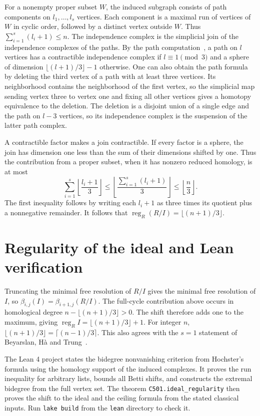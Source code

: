 \documentclass[11pt]{article}
\begin{document}
For a nonempty proper subset $W$, the induced subgraph consists of path
components on $l_1,\ldots,l_s$ vertices. Each component is a maximal run
of vertices of $W$ in cyclic order, followed by a distinct vertex outside
$W$. Thus $\sum_{i=1}^s(l_i+1)\le n$. The independence complex is the
simplicial join of the independence complexes of the paths. By the path
computation~\cite[Proposition~4.5]{kozlov}, a path on $l$ vertices has a
contractible independence complex if $l\equiv1\pmod3$ and a sphere of
dimension $\lfloor(l+1)/3\rfloor-1$ otherwise. One can also obtain the path
formula by deleting the third vertex of a path with at least three
vertices. Its neighborhood contains the neighborhood of the first vertex,
so the simplicial map sending vertex three to vertex one and fixing all
other vertices gives a homotopy equivalence to the deletion. The deletion
is a disjoint union of a single edge and the path on $l-3$ vertices, so
its independence complex is the suspension of the latter path complex.

A contractible factor makes a join contractible. If every factor is a
sphere, the join has dimension one less than the sum of their
dimensions shifted by one. Thus the contribution from a proper subset,
when it has nonzero reduced homology, is at most
\[
  \sum_{i=1}^s\left\lfloor\frac{l_i+1}{3}\right\rfloor
  \le \left\lfloor\frac{\sum_{i=1}^s(l_i+1)}{3}\right\rfloor
  \le \left\lfloor\frac{n}{3}\right\rfloor.
\]
The first inequality follows by writing each $l_i+1$ as three times its
quotient plus a nonnegative remainder. It follows that
$\operatorname{reg}_R(R/I)=\lfloor(n+1)/3\rfloor$.

\section*{Regularity of the ideal and Lean verification}

Truncating the minimal free resolution of $R/I$ gives the minimal free
resolution of $I$, so $\beta_{i,j}(I)=\beta_{i+1,j}(R/I)$. The full-cycle
contribution above occurs in homological degree
$n-\lfloor(n+1)/3\rfloor>0$. The shift therefore adds one to the maximum,
giving $\operatorname{reg}_R I=\lfloor(n+1)/3\rfloor+1$. For integer $n$,
$\lfloor(n+1)/3\rfloor=\lceil(n-1)/3\rceil$. This also agrees with the
$s=1$ statement of Beyarslan, H\`a and Trung~\cite[Theorem~5.2]{bht}.

The Lean 4 project states the bidegree nonvanishing criterion from
Hochster's formula using the homology support of the induced complexes.
It proves the run inequality for arbitrary lists, bounds all Betti
shifts, and constructs the extremal bidegree from the full vertex set.
The theorem \texttt{C501.ideal\_regularity} then proves the shift to the
ideal and the ceiling formula from the stated classical inputs. Run
\texttt{lake build} from the \texttt{lean} directory to check it.
\end{document}
